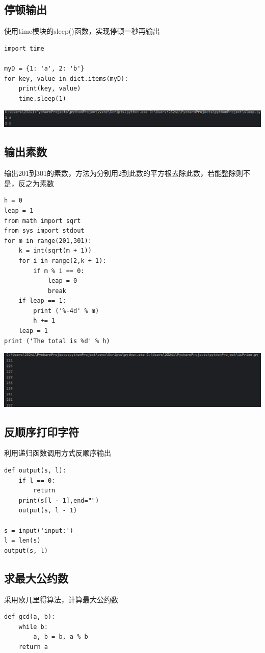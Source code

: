 \documentclass[UTF8,a4paper]{ctexart}
\begin{document}
\begin{sloppypar}
	\subsection{停顿输出}
	使用time模块的sleep()函数，实现停顿一秒再输出
	\begin{lstlisting}
import time

myD = {1: 'a', 2: 'b'}
for key, value in dict.items(myD):
    print(key, value)
    time.sleep(1)
    \end{lstlisting}
	
	\includegraphics[width = 16cm]{8}
	
	\subsection{输出素数}
	输出201到301的素数，方法为分别用2到此数的平方根去除此数，若能整除则不是，反之为素数
	\begin{lstlisting}
h = 0
leap = 1
from math import sqrt
from sys import stdout
for m in range(201,301):
    k = int(sqrt(m + 1))
    for i in range(2,k + 1):
        if m % i == 0:
            leap = 0
            break
    if leap == 1:
        print ('%-4d' % m)
        h += 1
    leap = 1
print ('The total is %d' % h)
	\end{lstlisting}
	\includegraphics[width = 16cm]{9}
	
	\subsection{反顺序打印字符}
	利用递归函数调用方式反顺序输出
	\begin{lstlisting}
def output(s, l):
    if l == 0:
        return
    print(s[l - 1],end="")
    output(s, l - 1)

s = input('input:')
l = len(s)
output(s, l)
	\end{lstlisting}
	
\subsection{求最大公约数}
	采用欧几里得算法，计算最大公约数
\begin{lstlisting}
def gcd(a, b):
    while b:
        a, b = b, a % b
    return a


\end{lstlisting}
\end{sloppypar}
\end{document}
